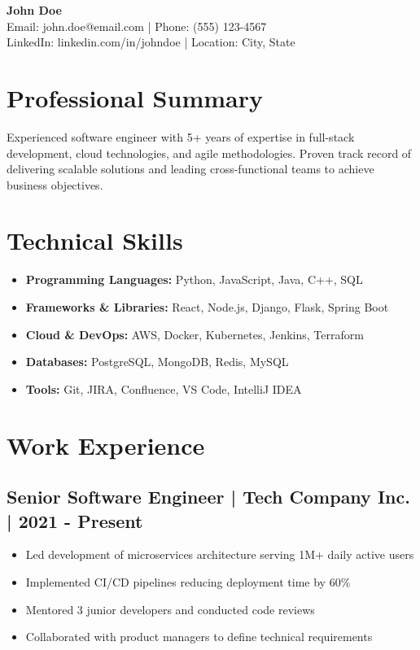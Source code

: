 \documentclass[11pt,a4paper]{article}
\begin{document}
\begin{center}
    {\LARGE \textbf{John Doe}} \\
    \vspace{0.2cm}
    Email: john.doe@email.com | Phone: (555) 123-4567 \\
    LinkedIn: linkedin.com/in/johndoe | Location: City, State
\end{center}

\vspace{0.3cm}

\section*{Professional Summary}
Experienced software engineer with 5+ years of expertise in full-stack development, cloud technologies, and agile methodologies. Proven track record of delivering scalable solutions and leading cross-functional teams to achieve business objectives.

\vspace{0.3cm}

\section*{Technical Skills}
\begin{itemize}[noitemsep]
    \item \textbf{Programming Languages:} Python, JavaScript, Java, C++, SQL
    \item \textbf{Frameworks \& Libraries:} React, Node.js, Django, Flask, Spring Boot
    \item \textbf{Cloud \& DevOps:} AWS, Docker, Kubernetes, Jenkins, Terraform
    \item \textbf{Databases:} PostgreSQL, MongoDB, Redis, MySQL
    \item \textbf{Tools:} Git, JIRA, Confluence, VS Code, IntelliJ IDEA
\end{itemize}

\vspace{0.3cm}

\section*{Work Experience}

\subsection*{Senior Software Engineer | Tech Company Inc. | 2021 - Present}
\begin{itemize}[noitemsep]
    \item Led development of microservices architecture serving 1M+ daily active users
    \item Implemented CI/CD pipelines reducing deployment time by 60\%
    \item Mentored 3 junior developers and conducted code reviews
    \item Collaborated with product managers to define technical requirements
\end{itemize}
\end{document}
